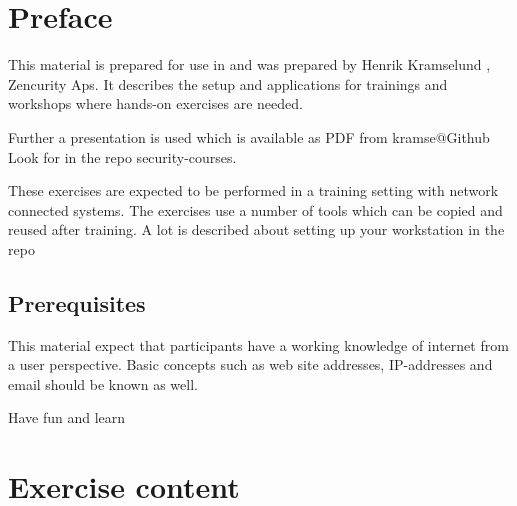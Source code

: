 \documentclass[a4paper,11pt,notitlepage]{report}
\begin{document}
\rm
{}

\newcommand{\course}[1]{System Integration F2020}


\setcounter{tocdepth}{0}

\normal

{\color{titlecolor}\tableofcontents}

\normal
\pagestyle{fancyplain}
\chapter*{\color{titlecolor}Preface}

This material is prepared for use in \emph{\course} and was prepared by
Henrik Kramselund  , Zencurity Aps.
It describes the setup and
applications for trainings and workshops where hands-on exercises are needed.

\vskip 1cm
Further a presentation is used which is available as PDF from kramse@Github\\
Look for \jobname in the repo security-courses.

These exercises are expected to be performed in a training setting with network
connected systems. The exercises use a number of tools which can be copied and
reused after training. A lot is described about setting up your workstation in
the repo


\section*{\color{titlecolor}Prerequisites}

This material expect that participants have a working knowledge of internet from
a user perspective. Basic concepts such as web site addresses, IP-addresses and
email should be known as well.

\vskip 1cm
Have fun and learn
\eject

\rhead{\fancyplain{}{\bf \chaptername\ \thechapter}}


\chapter*{\color{titlecolor}Exercise content}
\end{document}

